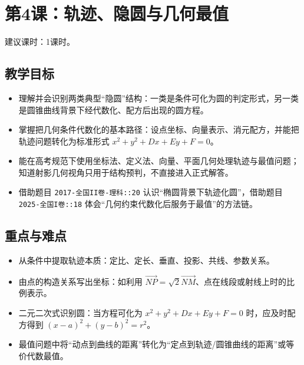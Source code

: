 \documentclass[UTF8,a4paper,11pt]{ctexart}
\begin{document}
\clearpage

\section{第4课：轨迹、隐圆与几何最值}

\noindent 建议课时：1课时。

\subsection*{教学目标}

\begin{itemize}

\item 理解并会识别两类典型“隐圆”结构：一类是条件可化为圆的判定形式，另一类是圆锥曲线背景下经代数化、配方后出现的圆方程。

\item 掌握把几何条件代数化的基本路径：设点坐标、向量表示、消元配方，并能把轨迹问题转化为标准形式 $x^2+y^2+Dx+Ey+F=0$。

\item 能在高考规范下使用坐标法、定义法、向量、平面几何处理轨迹与最值问题；知道射影几何视角只用于结构预判，不直接进入正式解答。

\item 借助题目 \texttt{2017-全国II卷-理科::20} 认识“椭圆背景下轨迹化圆”，借助题目 \texttt{2025-全国I卷::18} 体会“几何约束代数化后服务于最值”的方法链。

\end{itemize}

\subsection*{重点与难点}

\begin{itemize}

\item 从条件中提取轨迹本质：定比、定长、垂直、投影、共线、参数关系。

\item 由点的构造关系写出坐标：如利用 $\overrightarrow{NP}=\sqrt{2}\overrightarrow{NM}$、点在线段或射线上时的比例表示。

\item 二元二次式识别圆：当方程可化为 $x^2+y^2+Dx+Ey+F=0$ 时，应及时配方得到 $(x-a)^2+(y-b)^2=r^2$。

\item 最值问题中将“动点到曲线的距离”转化为“定点到轨迹/圆锥曲线的距离”或等价代数最值。

\end{itemize}
\end{document}
